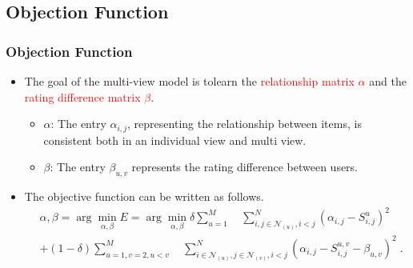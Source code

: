 \documentclass{beamer}
\newcommand{\red}[1]{\textcolor{red}{#1}}%
\begin{document}
\subsection{Objection Function}
\begin{frame}
\frametitle{Objection Function}
\begin{itemize}
  \item<2->
The goal of the multi-view model is tolearn the \red{relationship matrix $\alpha$} and the \red{rating difference matrix $\beta$}.

\begin{itemize}
\item \textbf{$\alpha$}: The entry $\alpha_{i,j}$, representing the relationship between items, is consistent both in an individual view and multi view.
\vskip 0.2in
\item \textbf{$\beta$}:  The entry $\beta_{u,v}$ represents the rating difference between users.
\end{itemize}

\vskip 0.2in
  \item<3->
The objective function can be written as follows.
\begin{equation}\label{eq:objectivefunction}
\begin{aligned}
  & \alpha,\beta = \arg\min_{\alpha,\beta} E = \arg\min_{\alpha,\beta} \delta \sum^M_{u=1}\quad\sum^N_{i,j \in \mathcal{N}_(u), i < j} \left( \alpha_ {i,j}-S^u_{i,j}\right)^2 \\
  & + \left(1-\delta\right) \sum^M_{u=1,{v=2},u<v}\quad \sum^N_{i \in \mathcal{N}_(u), j \in \mathcal{N}_(v), i<j}\left(\alpha_{i,j} - S^{u,v}_{i,j}-\beta_{u,v}\right)^2\;  .
\end{aligned}
\end{equation}
\end{itemize}
\end{frame}
\end{document}
